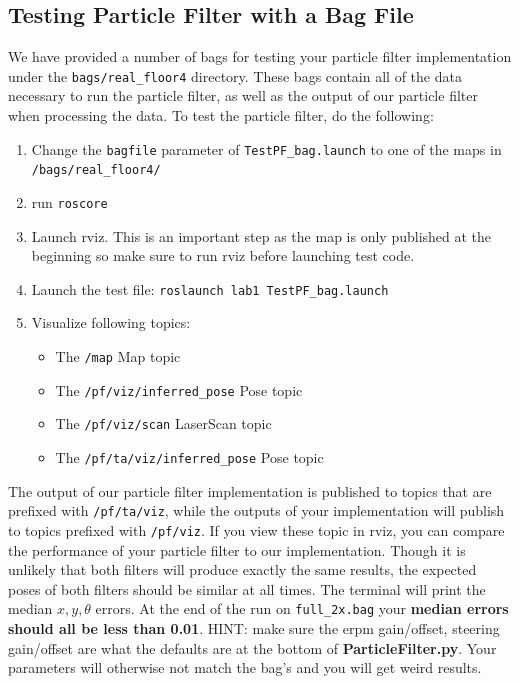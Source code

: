 \documentclass[final]{article}
\begin{document}
\subsection{Testing Particle Filter with a Bag File}
\label{sec:test-pf-bag}
We have provided a number of bags for testing your particle filter implementation under the \texttt{bags/real\_floor4} directory. These bags contain all of the data necessary to run the particle filter, as well as the output of our particle filter when processing the data. 
To test the particle filter, do the following:
\begin{enumerate}
\item Change the \texttt{bagfile} parameter of \texttt{TestPF\_bag.launch} to one of the maps in \texttt{/bags/real\_floor4/}
\item run \texttt{roscore}
\item Launch rviz. This is an important step as the map is only published at the beginning so make sure to run rviz before launching test code.
\item Launch the test file: \texttt{roslaunch lab1 TestPF\_bag.launch}
\item Visualize following topics:
	\begin{itemize}
	    \item The \texttt{/map} Map topic
		\item The \texttt{/pf/viz/inferred\_pose} Pose topic
		\item The \texttt{/pf/viz/scan} LaserScan topic
		\item The \texttt{/pf/ta/viz/inferred\_pose} Pose topic
	\end{itemize}
\end{enumerate} 

The output of our particle filter implementation is published to topics that are prefixed with \texttt{/pf/ta/viz}, while the outputs of your implementation will publish to topics prefixed with \texttt{/pf/viz}. If you view these topic in rviz, you can compare the performance of your particle filter to our implementation. Though it is unlikely that both filters will produce exactly the same results, the expected poses of both filters should be similar at all times. The terminal will print the median \(x,y,\theta\) errors. At the end of the run on \texttt{full\_2x.bag} your \textbf{median errors should all be less than 0.01}. HINT: make sure the erpm gain/offset, steering gain/offset are what the defaults are at the bottom of \textbf{ParticleFilter.py}. Your parameters will otherwise not match the bag's and you will get weird results.
\end{document}
